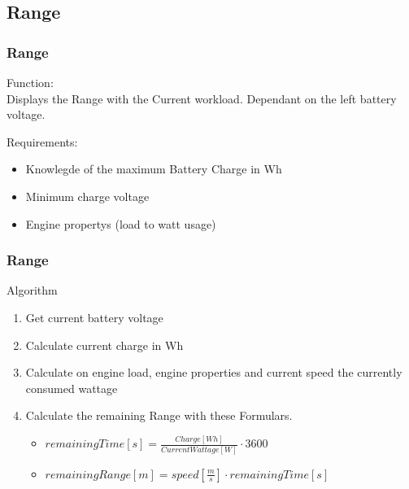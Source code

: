 \documentclass{beamer}
\begin{document}
\subsection{Range}
\begin{frame}
    \frametitle{Range}
    Function:\\
    Displays the Range with the Current workload. Dependant on the left battery voltage.

    Requirements:
    \begin{itemize}
        \item Knowlegde of the maximum Battery Charge in Wh
        \item Minimum charge voltage
        \item Engine propertys (load to watt usage)
    \end{itemize}
    

\end{frame}
\begin{frame}
    \frametitle{Range}
    Algorithm
    \begin{enumerate}
     \item Get current battery voltage
     \item Calculate current charge in Wh
     \item Calculate on engine load, engine properties and current speed the currently consumed wattage
     \item Calculate the remaining Range with these Formulars.
     \begin{itemize}
        \item $remainingTime\left[ s \right]=\frac{Charge\left[ Wh \right]}{Current Wattage\left[ W \right]}\cdot3600$
        \item $remainingRange\left[ m \right]=speed\left[ \frac{m}{s} \right]\cdot remainingTime\left[ s \right]$
     \end{itemize}
    \end{enumerate}
\end{frame}
\end{document}
